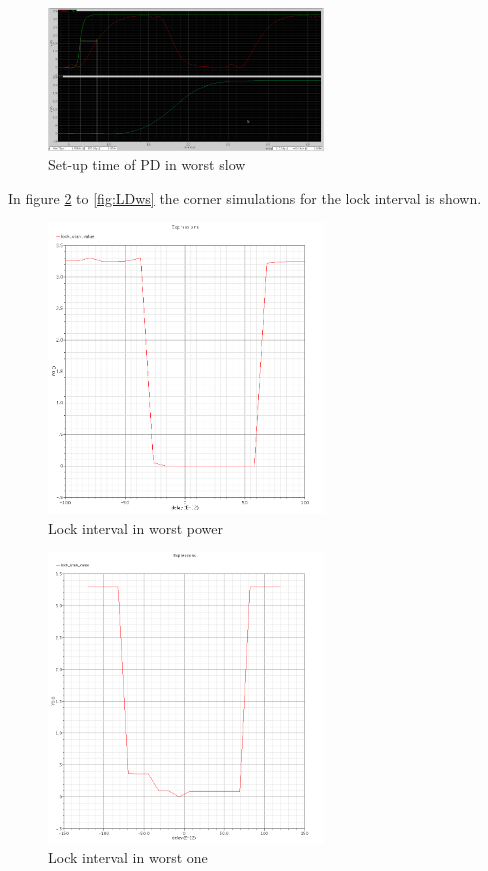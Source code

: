 \documentclass[a4paper,12pt]{article} \usepackage{graphicx}
\begin{document}
\begin{figure}[h]
  \centering
  \includegraphics[width=0.65\textwidth]{../Bilder/Layout/simulations/pd_ws.png}
  \caption{Set-up time of PD in worst slow}
  \label{fig:PDws}
\end{figure}


In figure \ref{fig:LDwp} to \ref{fig:LDws} the corner simulations for
the lock interval is shown.

\begin{figure}[h]
  \centering
  \includegraphics[width=0.65\textwidth]{../Bilder/LD_tran/LD_lsim_wp.png}
  \caption{Lock interval in worst power}
  \label{fig:LDwp}
\end{figure}

\begin{figure}[h]
  \centering
  \includegraphics[width=0.65\textwidth]{../Bilder/LD_tran/LD_lsim_wo.png}
  \caption{Lock interval in worst one}
  \label{fig:LDwo}
\end{figure}
\end{document}
